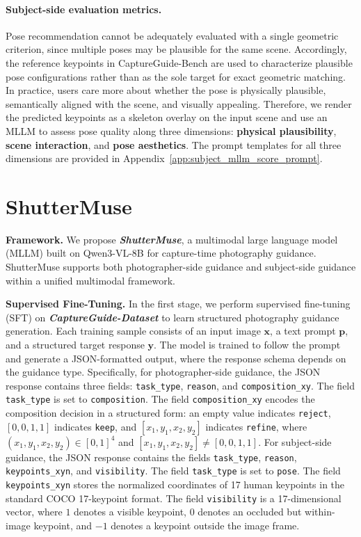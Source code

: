 \documentclass{llmxive}
\begin{document}
\paragraph{Subject-side evaluation metrics.}
Pose recommendation cannot be adequately evaluated with a single geometric criterion, since multiple poses may be plausible for the same scene. Accordingly, the reference keypoints in CaptureGuide-Bench are used to characterize plausible pose configurations rather than as the sole target for exact geometric matching. In practice, users care more about whether the pose is physically plausible, semantically aligned with the scene, and visually appealing. Therefore, we render the predicted keypoints as a skeleton overlay on the input scene and use an MLLM to assess pose quality along three dimensions: \textbf{physical plausibility}, \textbf{scene interaction}, and \textbf{pose aesthetics}. The prompt templates for all three dimensions are provided in Appendix~\ref{app:subject_mllm_score_prompt}.
\section{ShutterMuse}

\textbf{Framework.}
We propose \textbf{\textit{ShutterMuse}}, a multimodal large language model (MLLM) built on Qwen3-VL-8B \cite{bai2025qwen3} for capture-time photography guidance. ShutterMuse supports both photographer-side guidance and subject-side guidance within a unified multimodal framework.

\textbf{Supervised Fine-Tuning.}
In the first stage, we perform supervised fine-tuning (SFT) on \textbf{\textit{CaptureGuide-Dataset}} to learn structured photography guidance generation. Each training sample consists of an input image $\mathbf{x}$, a text prompt $\mathbf{p}$, and a structured target response $\mathbf{y}$. The model is trained to follow the prompt and generate a JSON-formatted output, where the response schema depends on the guidance type. Specifically, for photographer-side guidance, the JSON response contains three fields: \texttt{task\_type}, \texttt{reason}, and \texttt{composition\_xy}. The field \texttt{task\_type} is set to \texttt{composition}. The field \texttt{composition\_xy} encodes the composition decision in a structured form: an empty value indicates \texttt{reject}, $[0,0,1,1]$ indicates \texttt{keep}, and $[x_1,y_1,x_2,y_2]$ indicates \texttt{refine}, where $(x_1,y_1,x_2,y_2)\in[0,1]^4$ and $[x_1,y_1,x_2,y_2]\neq[0,0,1,1]$. For subject-side guidance, the JSON response contains the fields \texttt{task\_type}, \texttt{reason}, \texttt{keypoints\_xyn}, and \texttt{visibility}. The field \texttt{task\_type} is set to \texttt{pose}. The field \texttt{keypoints\_xyn} stores the normalized coordinates of 17 human keypoints in the standard COCO 17-keypoint format. The field \texttt{visibility} is a 17-dimensional vector, where $1$ denotes a visible keypoint, $0$ denotes an occluded but within-image keypoint, and $-1$ denotes a keypoint outside the image frame.
\end{document}
